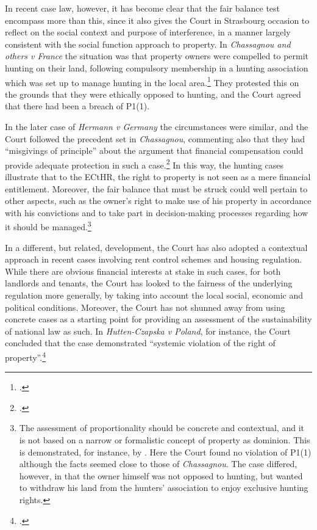 \documentclass[12pt,a4paper]{book} %
\begin{document}
In recent case law, however, it has become clear that the fair balance test encompass more than this, since it also gives the Court in Strasbourg occasion to reflect on the social context and purpose of interference, in a manner largely consistent with the social function approach to property. In {\it Chassagnou and others v France} the situation was that property owners were compelled to permit hunting on their land, following compulsory membership in a hunting association which was set up to manage hunting in the local area.\footcite{chassagnou99} They protested this on the grounds that they were ethically opposed to hunting, and the Court agreed that there had been a breach of P1(1). 

In the later case of {\it Hermann v Germany} the circumstances were similar, and the Court followed the precedent set in {\it Chassagnou}, commenting also that they had ``misgivings of principle'' about the argument that financial compensation could provide adequate protection in such a case.\footcite[See][91]{hermann12}  In this way, the hunting cases illustrate that to the ECtHR, the right to property is not seen as a mere financial entitlement. Moreover, the fair balance that must be struck could well pertain to other aspects, such as the owner's right to make use of his property in accordance with his convictions and to take part in decision-making processes regarding how it should be managed.\footnote{The assessment of proportionality should be concrete and contextual, and it is not based on a narrow or formalistic concept of property as dominion. This is demonstrated, for instance, by \cite{chabauty12}. Here the Court found no violation of P1(1) although the facts seemed close to those of {\it Chassagnou}. The case differed, however, in that the owner himself was not opposed to hunting, but wanted to withdraw his land from the hunters' association to enjoy exclusive hunting rights.}

In a different, but related, development, the Court has also adopted a contextual approach in recent cases involving rent control 
schemes and housing regulation. While there are obvious financial interests at stake in such cases, for both landlords and tenants, the Court has looked to the fairness of the underlying regulation more generally, by taking into account the local social, economic and political conditions. Moreover, the Court has not shunned away from using concrete cases as a starting point for providing an assessment of the sustainability of national law as such. In {\it Hutten-Czapska v Poland}, for instance, the Court concluded that the case demonstrated ``systemic violation of the right of property''.\footcite[239]{hutten06}
\end{document}
